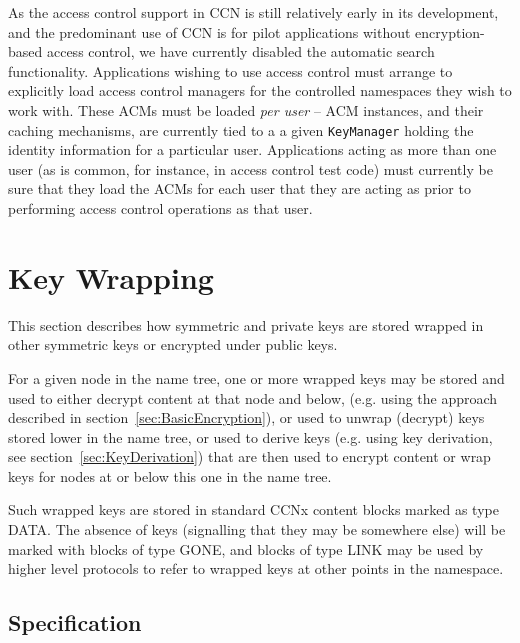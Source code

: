 As the access control support in CCN is still relatively early
in its development, and the predominant use of CCN is for pilot
applications without encryption-based access control, we have currently
disabled the automatic search functionality. Applications wishing
to use access control must arrange to explicitly load access control
managers for the controlled namespaces they wish to work with. These
ACMs must be loaded \emph{per user} -- ACM instances, and their caching
mechanisms, are currently tied to a a given {\tt KeyManager} holding the
identity information for a particular user. Applications acting as more
than one user (as is common, for instance, in access control test code) must
currently be sure that they load the ACMs for each user that they are acting
as prior to performing access control operations as that user.

\newpage

\section{Key Wrapping}
\label{sec:KeyWrapping}

This section describes how symmetric and private keys are stored
wrapped in other symmetric keys or encrypted under public keys.

For a given node in the name tree, one or more wrapped keys may be
stored and used to either decrypt content at that node and below,
(e.g. using the approach described in
section~\ref{sec:BasicEncryption}), or used to unwrap (decrypt) keys
stored lower in the name tree, or used to derive keys (e.g. using key
derivation, see section~\ref{sec:KeyDerivation}) that are then used to
encrypt content or wrap keys for nodes at or below this one in the
name tree.

Such wrapped keys are stored in standard CCNx content blocks marked as
type DATA. The absence of keys (signalling that they may be somewhere
else) will be marked with blocks of type GONE, and blocks of type LINK
may be used by higher level protocols to refer to wrapped keys at
other points in the namespace.

\subsection{Specification}

